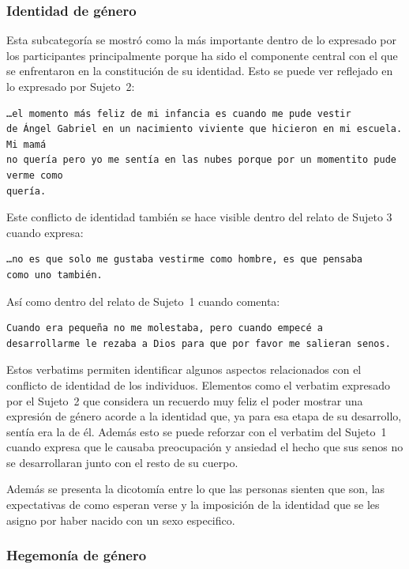 \subsubsection{Identidad de género}

Esta subcategoría se mostró como la más importante dentro de lo expresado por
los participantes principalmente porque ha sido el componente central con
el que se enfrentaron en la constitución de su identidad. Esto se puede ver
reflejado en lo expresado por Sujeto~2:

\begin{verbatim}
…el momento más feliz de mi infancia es cuando me pude vestir
de Ángel Gabriel en un nacimiento viviente que hicieron en mi escuela. Mi mamá
no quería pero yo me sentía en las nubes porque por un momentito pude verme como
quería.
\end{verbatim}

Este conflicto de identidad también se hace visible dentro del relato de Sujeto
3 cuando expresa:

\begin{verbatim}
…no es que solo me gustaba vestirme como hombre, es que pensaba
como uno también.
\end{verbatim}

Así como dentro del relato de Sujeto~1 cuando comenta:

\begin{verbatim}
Cuando era pequeña no me molestaba, pero cuando empecé a
desarrollarme le rezaba a Dios para que por favor me salieran senos.
\end{verbatim}

Estos verbatims permiten identificar algunos aspectos relacionados con el
conflicto de identidad de los individuos. Elementos como el verbatim expresado
por el Sujeto~2 que considera un recuerdo muy feliz el poder mostrar una
expresión de género acorde a la identidad que, ya para esa etapa de su
desarrollo, sentía era la de él. Además esto se puede reforzar con el verbatim
del Sujeto~1 cuando expresa que le causaba preocupación y ansiedad el hecho que
sus senos no se desarrollaran junto con el resto de su cuerpo.

Además se presenta la dicotomía entre lo que las personas sienten que son, las
expectativas de como esperan verse y la imposición de la identidad que se
les asigno por haber nacido con un sexo especifico.

\subsubsection{Hegemonía de género}

